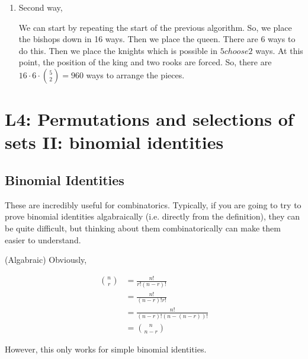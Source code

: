 \documentclass{report}
\begin{document}
{\begin{enumerate}
              At this point we have placed 5 of the 8 pieces. So there are $\frac{3!}{2!}$
              ways to place the next three pieces, given that their are two knights
              which are identitcal.

              All in all, there are $16\cdot (4 + 6 + 6 + 4)\cdot 3 = 960$. Hence,
              why it is called Chess 960.

        \item Second way,

              We can start by repeating the start of the previous algorithm. So,
              we place the bishops down in 16 ways. Then we place the queen. There are
              6 ways to do this. Then we place the knights which is possible in $5 choose 2$ ways.
              At this point, the position of the king and two rooks are forced. So,
              there are $16\cdot 6\cdot \binom{5}{2} = 960$ ways to arrange the pieces.
    \end{enumerate}

}

\section{L4: Permutations and selections of sets II: binomial identities}

\subsection*{Binomial Identities}

These are incredibly useful for combinatorics. Typically, if you are going to try
to prove binomial identities algabraically (i.e. directly from the definition),
they can be quite difficult, but thinking about them combinatorically can make
them easier to understand.


\begin{subproof}{(Algabraic)}
    Obviously,

    \begin{align*}
        \binom{n}{r} & = \frac{n!}{r!(n-r)!}              \\
                     & = \frac{n!}{(n-r)!r!}              \\
                     & = \frac{n!}{(n-r)! (n - (n - r))!} \\
                     & = \binom{n}{n-r}
    \end{align*}

    However, this only works for simple binomial identities.
\end{subproof}
\end{document}
